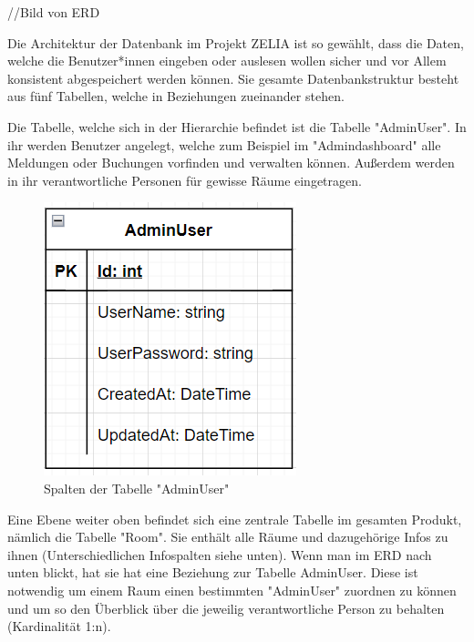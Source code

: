 
//Bild von ERD

Die Architektur der Datenbank im Projekt ZELIA ist so gewählt, dass die Daten, welche die Benutzer*innen eingeben oder auslesen wollen sicher und vor Allem konsistent abgespeichert werden können. Sie gesamte Datenbankstruktur besteht aus fünf Tabellen, welche in Beziehungen zueinander stehen.


Die Tabelle, welche sich in der Hierarchie befindet ist die Tabelle "AdminUser". In ihr werden Benutzer angelegt, welche zum Beispiel im "Admindashboard" alle Meldungen oder Buchungen vorfinden und verwalten können. Außerdem werden in ihr verantwortliche Personen für gewisse Räume eingetragen.

\begin{figure}[H]
    \centering
    \includegraphics{media/MariaDB/AdminUser.png}
    \caption{Spalten der Tabelle "AdminUser"}
\end{figure}


Eine Ebene weiter oben befindet sich eine zentrale Tabelle im gesamten Produkt, nämlich die Tabelle "Room". Sie enthält alle Räume und dazugehörige Infos zu ihnen (Unterschiedlichen Infospalten siehe unten). Wenn man im ERD nach unten blickt, hat sie hat eine Beziehung zur Tabelle AdminUser. Diese ist notwendig um einem Raum einen bestimmten "AdminUser" zuordnen zu können und um so den Überblick über die jeweilig verantwortliche Person zu behalten (Kardinalität 1:n).

